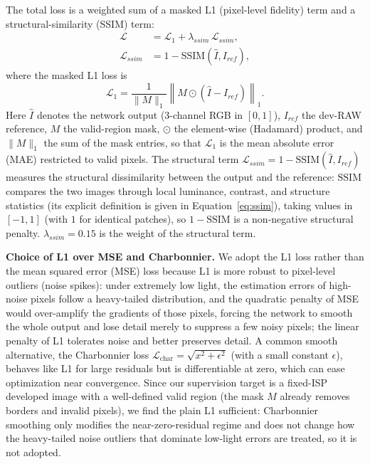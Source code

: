 \documentclass[remotesensing,article,accept,moreauthors]{Definitions/mdpi}
\begin{document}
The total loss is a weighted sum of a masked L1 (pixel-level fidelity) term and a structural-similarity (SSIM) term:
\begin{align}
\mathcal{L} &= \mathcal{L}_1 + \lambda_{ssim}\,\mathcal{L}_{ssim}, \label{eq:totalloss} \\
\mathcal{L}_{ssim} &= 1 - \mathrm{SSIM}(\hat{I}, I_{ref}), \label{eq:ssimterm}
\end{align}
where the masked L1 loss is
\begin{equation}
\mathcal{L}_1 = \frac{1}{\|M\|_1}\left\| M \odot (\hat{I} - I_{ref}) \right\|_1.
\end{equation}
Here $\hat{I}$ denotes the network output (3-channel RGB in $[0,1]$), $I_{ref}$ the dev-RAW reference, $M$ the valid-region mask, $\odot$ the element-wise (Hadamard) product, and $\|M\|_1$ the sum of the mask entries, so that $\mathcal{L}_1$ is the mean absolute error (MAE) restricted to valid pixels. The structural term $\mathcal{L}_{ssim}=1-\mathrm{SSIM}(\hat{I},I_{ref})$ measures the structural dissimilarity between the output and the reference: $\mathrm{SSIM}$ compares the two images through local luminance, contrast, and structure statistics (its explicit definition is given in Equation~\eqref{eq:ssim}), taking values in $[-1,1]$ (with $1$ for identical patches), so $1-\mathrm{SSIM}$ is a non-negative structural penalty. $\lambda_{ssim}=0.15$ is the weight of the structural term.

\textbf{Choice of L1 over MSE and Charbonnier.} We adopt the L1 loss rather than the mean squared error (MSE) loss because L1 is more robust to pixel-level outliers (noise spikes): under extremely low light, the estimation errors of high-noise pixels follow a heavy-tailed distribution, and the quadratic penalty of MSE would over-amplify the gradients of those pixels, forcing the network to smooth the whole output and lose detail merely to suppress a few noisy pixels; the linear penalty of L1 tolerates noise and better preserves detail. A common smooth alternative, the Charbonnier loss $\mathcal{L}_{\mathrm{char}}=\sqrt{x^{2}+\epsilon^{2}}$ (with a small constant $\epsilon$), behaves like L1 for large residuals but is differentiable at zero, which can ease optimization near convergence. Since our supervision target is a fixed-ISP developed image with a well-defined valid region (the mask $M$ already removes borders and invalid pixels), we find the plain L1 sufficient: Charbonnier smoothing only modifies the near-zero-residual regime and does not change how the heavy-tailed noise outliers that dominate low-light errors are treated, so it is not adopted.
\end{document}
